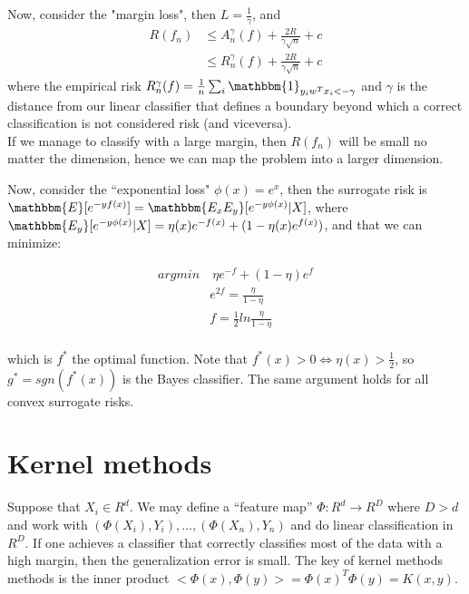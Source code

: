 \documentclass[11pt, english]{article}
\begin{document}
Now, consider the "margin loss", then $L = \frac{1}{\gamma}$, and
\begin{align*}
	 R(f_n) &\leq A_n^{\gamma}(f) + \frac{2R}{\gamma\sqrt{n}} + c\\
	 &\leq R_n^{\gamma}(f) + \frac{2R}{\gamma\sqrt{n}} + c
\end{align*}
where the empirical risk $R_n^{\gamma}(f) = \frac{1}{n} \sum_i \mathbbm{1}_{y_iw^Tx_i < -\gamma}$ and $\gamma$ is the distance from our linear classifier that defines a boundary beyond which a correct classification is not considered risk (and viceversa).\\
 
If we manage to classify with a large margin, then $R(f_n)$ will be small no matter the dimension, hence we can map the problem into a larger dimension.
 
Now, consider the ``exponential loss" $\phi(x) = e^x$, then the surrogate risk is $\mathbbm{E}[e^{-yf(x)}] = \mathbbm{E_xE_y}[e^{-y\phi(x)}|X]$, where $\mathbbm{E_y}[e^{-y\phi(x)}|X] = \eta(x) e^{-f(x)} + (1-\eta(x)e^{f(x)})$, and that we can minimize:
 
\begin{align*}
	 arg min &\ \eta e^{-f} + (1-\eta)e^f\\
	 & e^{2f} = \frac{\eta}{1 - \eta}\\
	 & f = \frac{1}{2} ln \frac{\eta}{1 - \eta}
\end{align*}
\linebreak
\linebreak
\\
which is $f^*$ the optimal function. Note that $f^*(x)>0 \Leftrightarrow \eta(x)>\frac{1}{2}$, so $g^* = sgn(f^*(x))$ is the Bayes classifier. The same argument holds for all convex surrogate risks.
 

\section{Kernel methods}

Suppose that $X_i \in R^d$. We may define a ``feature map'' $\Phi : R^d \rightarrow R^D$ where $ D>d$ and work with $(\Phi(X_i), Y_i), \dots, (\Phi(X_n), Y_n)$ and do linear classification in $R^D$. If one achieves a classifier that correctly classifies most of the data with a high margin, then the generalization error is small. The key of kernel methods methods is the inner product $<\Phi(x), \Phi(y)> = \Phi(x)^T \Phi(y) = K(x,y)$.\\
\end{document}
